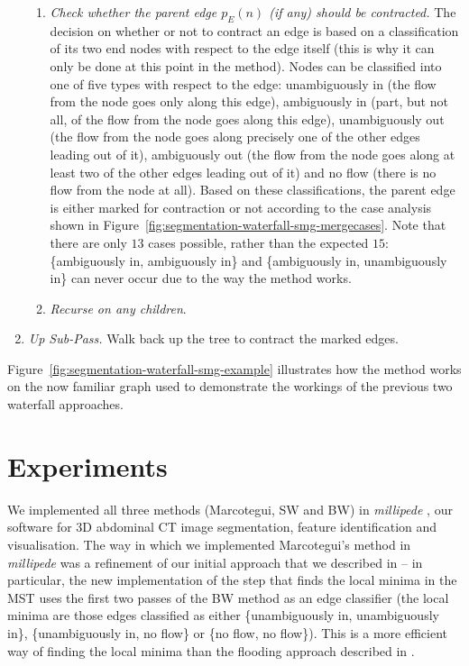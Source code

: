 \documentclass[preprint,a4paper]{elsarticle}
\begin{document}
\begin{enumerate}
\begin{enumerate}
\item \emph{Check whether the parent edge $p_E(n)$ (if any) should be contracted.} The decision on whether or not to contract an edge is based on a classification of its two end nodes with respect to the edge itself (this is why it can only be done at this point in the method). Nodes can be classified into one of five types with respect to the edge: unambiguously in (the flow from the node goes only along this edge), ambiguously in (part, but not all, of the flow from the node goes along this edge), unambiguously out (the flow from the node goes along precisely one of the other edges leading out of it), ambiguously out (the flow from the node goes along at least two of the other edges leading out of it) and no flow (there is no flow from the node at all). Based on these classifications, the parent edge is either marked for contraction or not according to the case analysis shown in Figure~\ref{fig:segmentation-waterfall-smg-mergecases}. Note that there are only $13$ cases possible, rather than the expected $15$: \{ambiguously in, ambiguously in\} and \{ambiguously in, unambiguously in\} can never occur due to the way the method works.

\item \emph{Recurse on any children}.
\end{enumerate}

\item \emph{Up Sub-Pass.} Walk back up the tree to contract the marked edges.

\end{enumerate}

\noindent Figure~\ref{fig:segmentation-waterfall-smg-example} illustrates how the method works on the now familiar graph used to demonstrate the workings of the previous two waterfall approaches.

\section{Experiments}
\label{sec:experiments}

We implemented all three methods (Marcotegui, SW and BW) in \emph{millipede} \cite{millipede}, our software for 3D abdominal CT image segmentation, feature identification and visualisation. The way in which we implemented Marcotegui's method in \emph{millipede} was a refinement of our initial approach that we described in \cite{golodetz08} -- in particular, the new implementation of the step that finds the local minima in the MST uses the first two passes of the BW method as an edge classifier (the local minima are those edges classified as either \{unambiguously in, unambiguously in\}, \{unambiguously in, no flow\} or \{no flow, no flow\}). This is a more efficient way of finding the local minima than the flooding approach described in \cite{golodetz08}.
\end{document}
